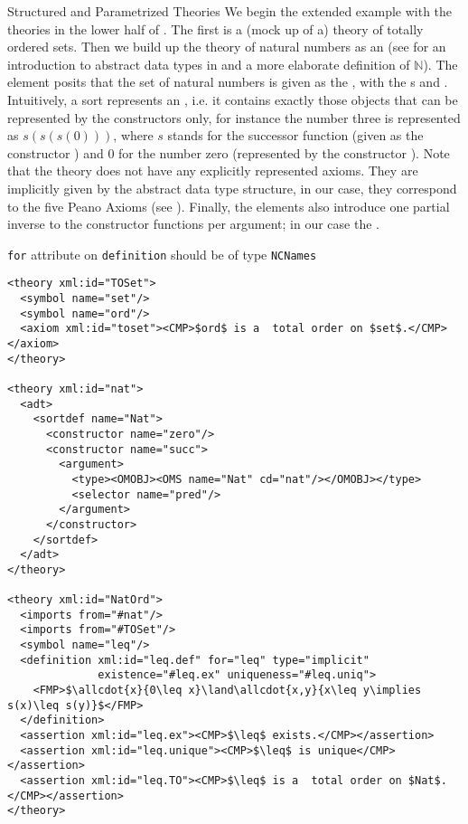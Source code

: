 \begin{tchapter}[id=natlist]{Structured and Parametrized Theories}
We begin the extended example with the theories in the lower half of
{}.  The first is a (mock up of a) theory of totally
ordered sets. Then we build up the theory of natural numbers as an
{} (see {} for an introduction to abstract
data types in {\omdoc} and a more elaborate definition of $\mathbb N$). The
{} element posits that the set of natural numbers is given as the
{} {}, with the {s} {} and
{}. Intuitively, a sort represents an {},
i.e. it contains exactly those objects that can be represented by the constructors only,
for instance the number three is represented as $s(s(s(0)))$, where $s$ stands for the
successor function (given as the constructor {}) and $0$ for the number zero
(represented by the constructor {}). Note that the theory {}
does not have any explicitly represented axioms. They are implicitly given by the abstract
data type structure, in our case, they correspond to the five Peano Axioms (see
{}).  Finally, the {} elements also introduce one
partial inverse to the constructor functions per argument; in our case the
{}.
\begin{erratum}[reported-by=Michael Kohlhase,date=2009-08-11]{{\texttt{for}} attribute on
    {\texttt{definition}} should be of type {\texttt{NCNames}}}
\begin{lstlisting}[mathescape,label=lst:nat-param,
  index={theory,symbol,definition,assertion}]
<theory xml:id="TOSet">                   
  <symbol name="set"/>
  <symbol name="ord"/>
  <axiom xml:id="toset"><CMP>$ord$ is a  total order on $set$.</CMP></axiom>
</theory>                               

<theory xml:id="nat">
  <adt>
    <sortdef name="Nat">
      <constructor name="zero"/>
      <constructor name="succ">
        <argument>
          <type><OMOBJ><OMS name="Nat" cd="nat"/></OMOBJ></type>
          <selector name="pred"/>
        </argument>
      </constructor>
    </sortdef>
  </adt>
</theory>

<theory xml:id="NatOrd">
  <imports from="#nat"/>
  <imports from="#TOSet"/>
  <symbol name="leq"/>
  <definition xml:id="leq.def" for="leq" type="implicit" 
              existence="#leq.ex" uniqueness="#leq.uniq">
    <FMP>$\allcdot{x}{0\leq x}\land\allcdot{x,y}{x\leq y\implies s(x)\leq s(y)}$</FMP>
  </definition>
  <assertion xml:id="leq.ex"><CMP>$\leq$ exists.</CMP></assertion>
  <assertion xml:id="leq.unique"><CMP>$\leq$ is unique</CMP></assertion>
  <assertion xml:id="leq.TO"><CMP>$\leq$ is a  total order on $Nat$.</CMP></assertion>
</theory>                       
\end{lstlisting}
\end{erratum}


\end{tchapter}
